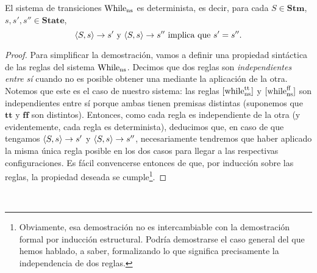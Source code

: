 \begin{theorem}\label{determinismo}
El sistema de transiciones $\mathrm{While}_{\mathrm{ns}}$ es determinista, es decir, para cada $S \in \mathbf{Stm}$, $s, s', s'' \in \mathbf{State}$,  
$$\langle S, s \rangle\rightarrow s' \text{ y } \langle S, s \rangle\rightarrow s'' \text{ implica que } s'= s''.$$
\end{theorem}
\begin{proof}
Para simplificar la demostración, vamos a definir una propiedad sintáctica de las reglas del sistema $\mathrm{While}_{\mathrm{ns}}$. Decimos que dos reglas son \textit{independientes entre sí} cuando no es posible obtener una mediante la aplicación de la otra. Notemos que este es el caso de nuestro sistema: las reglas $[\mathrm{while}_{\mathrm{ns}}^{\mathrm{tt}}]$ y $[\mathrm{while}_{\mathrm{ns}}^{\mathrm{ff}}]$ son independientes entre sí porque ambas tienen premisas distintas (suponemos que $\mathbf{tt}$ y $\mathbf{ff}$ son distintos). Entonces, como cada regla es independiente de la otra (y evidentemente, cada regla es determinista), deducimos que, en caso de que tengamos $\langle S, s \rangle\rightarrow s'$ y $\langle S, s \rangle\rightarrow s''$, necesariamente tendremos que haber aplicado la misma única regla posible en los dos casos para llegar a las respectivas configuraciones. Es fácil convencerse entonces de que, por inducción sobre las reglas, la propiedad deseada se cumple\footnote{Obviamente, esa demostración no es intercambiable con la demostración formal por inducción estructural. Podría demostrarse el caso general del que hemos hablado, a saber, formalizando lo que significa precisamente la independencia de dos reglas.}. 
\end{proof}
\\


